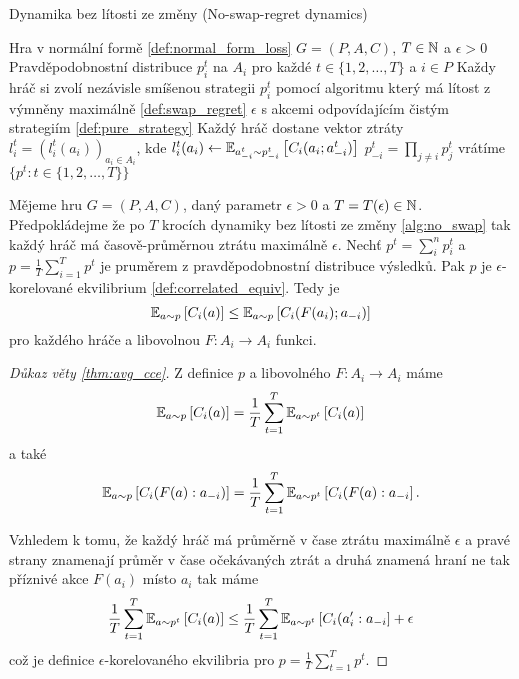 \begin{algorithm}
    \algrenewcommand{}
    \algrenewcommand{}
    \caption{Dynamika bez lítosti ze změny (No-swap-regret dynamics)}
    \label{alg:no_swap}
    \begin{algorithmic}[1]
        \Require Hra v normální formě \ref{def:normal_form_loss} $G= (P,A,C)$, $T\in \N$ a $\epsilon >0$
        \Ensure Pravděpodobnostní distribuce $p^t_i$ na $A_i$ pro každé $t \in \{1,2,\dots, T\}$ a $i \in P$ 
            \State Každy hráč si zvolí nezávisle smíšenou strategii $p^t_i$ pomocí algoritmu který má lítost z výmněny maximálně \ref{def:swap_regret} $\epsilon$ s akcemi odpovídajícím čistým strategiím \ref{def:pure_strategy}
            \State Každý hráč dostane vektor ztráty $l^t_i = (l_i^t(a_i))_{a_i \in A_i}$, kde $l^t_i(a_i) \leftarrow \E[a_{-i}^t \sim p_{-i}^t]{C_i(a_i;a^t_{-i})}$
            \State $p^t_{-i} = \prod_{j \neq i} p_j^t$
        \EndFor
        \State vrátíme $\{p^t: t\in \{1,2,\dots,T\}\}$
    \end{algorithmic}
\end{algorithm}

\begin{theorem}\label{thm:avg_cce}
Mějeme hru $G=(P,A,C)$, daný parametr $\epsilon > 0$ a $T = T(\epsilon) \in \N$. Předpokládejme že po $T$ krocích dynamiky bez lítosti ze změny \ref{alg:no_swap} tak každý hráč má časově-průměrnou ztrátu maximálně $\epsilon$. 
Nechť $p^t =\sum_i^n p^t_i$ a $p = \frac{1}{T} \sum^T_{i=1} p^t$ je pruměrem z pravděpodobnostní distribuce výsledků. Pak $p$ je $\epsilon$-korelované ekvilibrium \ref{def:correlated_equiv}. Tedy je  
\[
    \E[a \sim p]{C_i(a)} \leq \E[a\sim p]{C_i(F(a_i);a_{-i})}
\]
pro každého hráče a libovolnou $F: A_i \rightarrow A_i$ funkci.
\end{theorem}
\begin{proof}[Důkaz věty \ref{thm:avg_cce}]
    Z definice $p$ a libovolného $F: A_i \rightarrow A_i$ máme 
    \[
        \E[a \sim p]{C_i(a)} = \frac{1}{T} \sum^T_{t=1} \E[a\sim p^t]{C_i(a)}
    \]
    a také
    \[
        \E[a \sim p]{C_i(F(a):a_{-i})} = \frac{1}{T} \sum^T_{t=1} \E[a\sim p^t]{C_i(F(a):a_{-i}}.
    \]

    Vzhledem k tomu, že každý hráč má průměrně v čase ztrátu maximálně $\epsilon$ a pravé strany znamenají průměr v čase očekávaných ztrát a druhá znamená hraní ne tak příznivé akce $F(a_i)$ místo $a_i$ tak máme
    \[
         \frac{1}{T} \sum^T_{t=1} \E[a\sim p^t]{C_i(a)} \leq \frac{1}{T} \sum^T_{t=1} \E[a\sim p^t]{C_i(a_i':a_{-i}} + \epsilon  
    \]
    což je definice $\epsilon$-korelovaného ekvilibria pro $p = \frac{1}{T} \sum^T_{t=1} p^t$. 
\end{proof}
